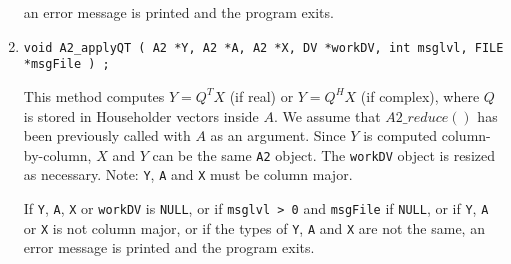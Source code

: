 \begin{enumerate}
an error message is printed and the program exits.
\item
\begin{verbatim}
void A2_applyQT ( A2 *Y, A2 *A, A2 *X, DV *workDV, int msglvl, FILE *msgFile ) ;
\end{verbatim}
This method computes $Y = Q^T X$ (if real) or $Y = Q^H X$ (if
complex), where $Q$ is stored in Householder vectors inside $A$.
We assume that $A2\_reduce()$ has been previously called with $A$
as an argument.
Since $Y$ is computed column-by-column, $X$ and $Y$ can be the same
{\tt A2} object.
The {\tt workDV} object is resized as necessary.
Note: {\tt Y}, {\tt A} and {\tt X} must be column major.
\par {}
If {\tt Y}, {\tt A}, {\tt X} or {\tt workDV} is {\tt NULL}, 
or if {\tt msglvl > 0} and {\tt msgFile} if {\tt NULL},
or if {\tt Y}, {\tt A} or {\tt X} is not column major,
or if the types of {\tt Y}, {\tt A} and {\tt X} are not the same,
an error message is printed and the program exits.
\end{enumerate}
\par
